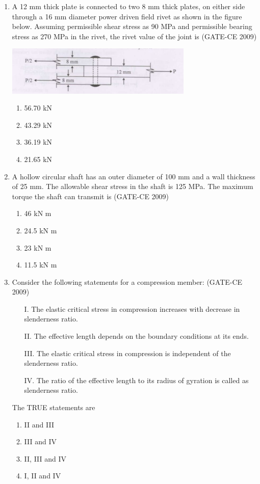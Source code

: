 \documentclass[12pt]{article}
\begin{document}
\begin{enumerate}[label=Q.\arabic*]
    \item A 12 mm thick plate is connected to two 8 mm thick plates, on either side through a 16 mm diameter power driven field rivet as shown in the figure below. Assuming permissible shear stress as 90 MPa and permissible bearing stress as 270 MPa in the rivet, the rivet value of the joint is (GATE-CE 2009)
    \begin{center}
    \includegraphics[width=0.7\textwidth]{image2.jpg}
    \end{center}
    \begin{enumerate}[label=(\Alph*)]
        \item 56.70 kN 
        \item 43.29 kN 
        \item 36.19 kN 
        \item 21.65 kN
    \end{enumerate}
    
    \item A hollow circular shaft has an outer diameter of 100 mm and a wall thickness of 25 mm. The allowable shear stress in the shaft is 125 MPa. The maximum torque the shaft can transmit is (GATE-CE 2009)
    \begin{enumerate}[label=(\Alph*)]
        \item 46 kN m 
        \item 24.5 kN m 
        \item 23 kN m 
        \item 11.5 kN m
    \end{enumerate}
    
    \item Consider the following statements for a compression member: (GATE-CE 2009)
    \begin{itemize}
        \item[I.] The elastic critical stress in compression increases with decrease in slenderness ratio.
        \item[II.] The effective length depends on the boundary conditions at its ends.
        \item[III.] The elastic critical stress in compression is independent of the slenderness ratio.
        \item[IV.] The ratio of the effective length to its radius of gyration is called as slenderness ratio.
    \end{itemize}
    The TRUE statements are \\
    \begin{enumerate}[label=(\Alph*)]
        \item II and III 
        \item III and IV 
        \item II, III and IV 
        \item I, II and IV
    \end{enumerate}
    

\end{enumerate}
\end{document}

